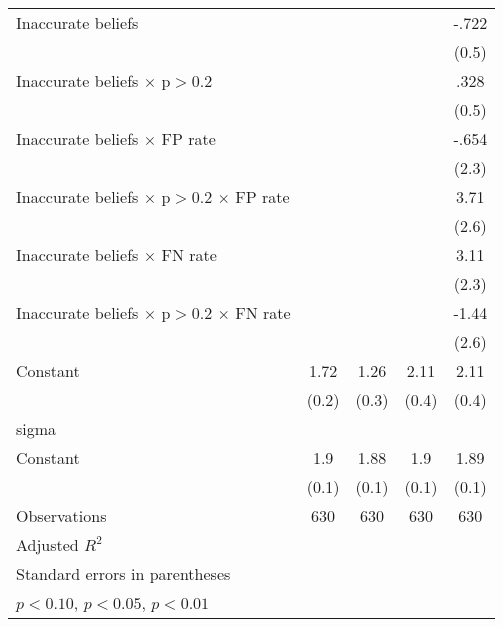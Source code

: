 {\begin{tabular}{l*{4}{c}}
Inaccurate beliefs&                  &                  &                  &    -.722         \\
                &                  &                  &                  &    (0.5)         \\
Inaccurate beliefs $\times$ p$>$0.2&                  &                  &                  &     .328         \\
                &                  &                  &                  &    (0.5)         \\
Inaccurate beliefs $\times$ FP rate&                  &                  &                  &    -.654         \\
                &                  &                  &                  &    (2.3)         \\
Inaccurate beliefs $\times$ p$>$0.2 $\times$ FP rate&                  &                  &                  &     3.71         \\
                &                  &                  &                  &    (2.6)         \\
Inaccurate beliefs $\times$ FN rate&                  &                  &                  &     3.11         \\
                &                  &                  &                  &    (2.3)         \\
Inaccurate beliefs $\times$ p$>$0.2 $\times$ FN rate&                  &                  &                  &    -1.44         \\
                &                  &                  &                  &    (2.6)         \\
Constant        &     1.72\sym{***}&     1.26\sym{***}&     2.11\sym{***}&     2.11\sym{***}\\
                &    (0.2)         &    (0.3)         &    (0.4)         &    (0.4)         \\
\hline
sigma           &                  &                  &                  &                  \\
Constant        &      1.9\sym{***}&     1.88\sym{***}&      1.9\sym{***}&     1.89\sym{***}\\
                &    (0.1)         &    (0.1)         &    (0.1)         &    (0.1)         \\
\hline
Observations    &      630         &      630         &      630         &      630         \\
Adjusted \(R^{2}\)&                  &                  &                  &                  \\
\hline\hline
\multicolumn{5}{l}{\footnotesize Standard errors in parentheses}\\
\multicolumn{5}{l}{\footnotesize \sym{*} \(p<0.10\), \sym{**} \(p<0.05\), \sym{***} \(p<0.01\)}\\
\end{tabular}
}
